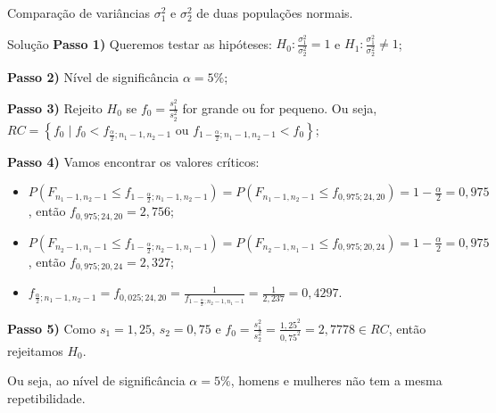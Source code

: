 \documentclass[9pt]{beamer}
\begin{document}
\begin{frame}{Comparação de variâncias $\sigma_1^2$ e $\sigma_2^2$ de duas populações normais.}

\small

\begin{block}{Solução}
	\textbf{Passo 1)} Queremos testar as hipóteses: $H_0: \frac{\sigma_1^2}{\sigma_2^2} = 1$ e $H_1: \frac{\sigma_1^2}{\sigma_2^2} \neq 1$;
	
	\textbf{Passo 2)} Nível de significância $\alpha=5\%$;
	
	\textbf{Passo 3)} Rejeito $H_0$ se $f_0 = \frac{s_1^2}{s_2^2}$ for grande ou for pequeno. Ou seja, $RC=\left\{
	 f_0 \mid f_0 < f_{\frac{\alpha}{2}; n_1-1, n_2-1} \mbox{ ou } f_{1-\frac{\alpha}{2}; n_1-1, n_2-1} < f_0 \right\}$;
	 
	 \textbf{Passo 4)} Vamos encontrar os valores críticos:
	 \begin{itemize}
	 	\item $P(F_{n_1-1, n_2-1} \leq f_{1-\frac{\alpha}{2}; n_1-1, n_2-1}) = P(F_{n_1-1, n_2-1} \leq f_{0,975; 24, 20}) = 1- \frac{\alpha}{2}= 0,975$, então $f_{0,975; 24, 20} = 2,756$;
	 	\item $P(F_{n_2-1, n_1-1} \leq f_{1-\frac{\alpha}{2}; n_2-1, n_1-1}) = P(F_{n_2-1, n_1-1} \leq f_{0,975; 20, 24}) = 1- \frac{\alpha}{2}= 0,975$, então $f_{0,975; 20, 24} = 2,327$;
	 	\item $f_{\frac{\alpha}{2}; n_1-1, n_2-1} = f_{0,025; 24, 20} = \frac{1}{f_{1-\frac{\alpha}{2}; n_2-1, n_1-1}} = \frac{1}{2,237} = 0,4297$.
	 \end{itemize}
 
 	\textbf{Passo 5)} Como $s_1=1,25$, $s_2=0,75$ e $f_0 = \frac{s_1^2}{s_2^2} = \frac{1,25^2}{0,75^2} = 2,7778 \in RC$, então rejeitamos $H_0$.
 	
 	Ou seja, ao nível de significância $\alpha=5\%$, homens e mulheres não tem a mesma repetibilidade.
\end{block}

\normalsize

\end{frame}
\end{document}
